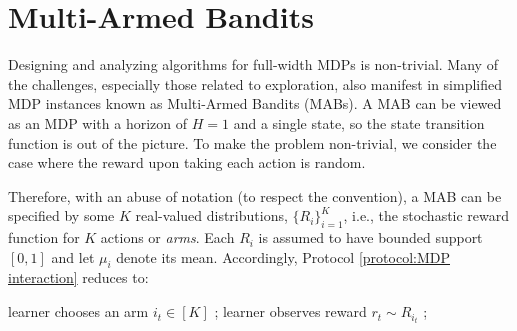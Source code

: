 


\section{Multi-Armed Bandits}
Designing and analyzing algorithms for full-width MDPs is non-trivial.
Many of the challenges, especially those related to exploration, also manifest in simplified MDP instances known as Multi-Armed Bandits (MABs).
A MAB can be viewed as an MDP with a horizon of $H=1$ and a single state, so the state transition function is out of the picture.
To make the problem non-trivial, we consider the case where the reward upon taking each action is random.

Therefore, with an abuse of notation (to respect the convention), a MAB can be specified by some $K$ real-valued distributions, $\{R_i\}_{i=1}^K$, i.e., the stochastic reward function for $K$ actions or {\em arms}.
Each $R_i$ is assumed to have bounded support $[0,1]$ and let $\mu_i$ denote its mean.
Accordingly, Protocol \ref{protocol:MDP interaction} reduces to:
\begin{protocol}
\caption{MAB interaction} \label{protocol:MAB interaction}
\begin{algorithmic}[1]
    \State learner chooses an arm $i_t\in[K]$ ;
    \State learner observes reward $r_t\sim R_{i_t}$ ;
\EndFor
\end{algorithmic}
\end{protocol}



